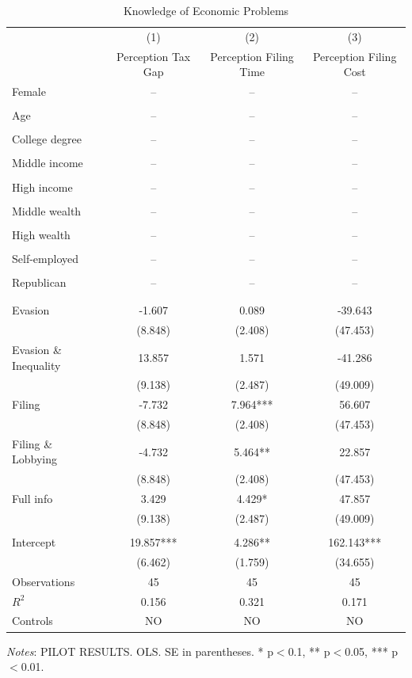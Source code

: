\documentclass[11pt]{article}
\begin{document}
\begin{table}[!htbp]\centering
\caption{Knowledge of Economic Problems}
\label{tab:perception_noc}
\begin{threeparttable}
\footnotesize
\begin{tabular}{l|ccc}
\toprule
& (1) & (2) & (3) \\
& Perception Tax Gap & Perception Filing Time & Perception Filing Cost \\
\midrule
Female & -- & -- & -- \\
 &  &  &  \\
Age & -- & -- & -- \\
 &  &  &  \\
College degree & -- & -- & -- \\
 &  &  &  \\
Middle income & -- & -- & -- \\
 &  &  &  \\
High income & -- & -- & -- \\
 &  &  &  \\
Middle wealth & -- & -- & -- \\
 &  &  &  \\
High wealth & -- & -- & -- \\
 &  &  &  \\
Self-employed & -- & -- & -- \\
 &  &  &  \\
Republican & -- & -- & -- \\
 &  &  &  \\
\\[0.5em]
Evasion & -1.607 & 0.089 & -39.643 \\
 & (8.848) & (2.408) & (47.453) \\
Evasion \& Inequality & 13.857 & 1.571 & -41.286 \\
 & (9.138) & (2.487) & (49.009) \\
Filing & -7.732 & 7.964*** & 56.607 \\
 & (8.848) & (2.408) & (47.453) \\
Filing \& Lobbying & -4.732 & 5.464** & 22.857 \\
 & (8.848) & (2.408) & (47.453) \\
Full info & 3.429 & 4.429* & 47.857 \\
 & (9.138) & (2.487) & (49.009) \\
\\[0.5em]
Intercept & 19.857*** & 4.286** & 162.143*** \\
 & (6.462) & (1.759) & (34.655) \\
\midrule
Observations & 45 & 45 & 45 \\
$R^2$ & 0.156 & 0.321 & 0.171 \\
Controls & NO & NO & NO \\
\bottomrule
\end{tabular}
\begin{tablenotes}[flushleft]
\footnotesize
\item \textit{Notes}: PILOT RESULTS. OLS. SE in parentheses. * p$<$0.1, ** p$<$0.05, *** p$<$0.01.
\end{tablenotes}
\end{threeparttable}
\end{table}
\end{document}
